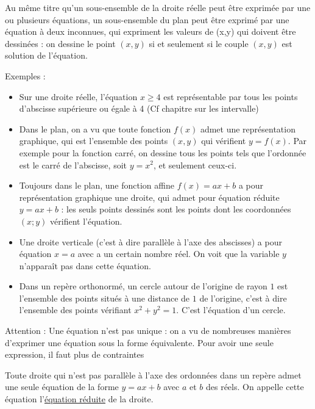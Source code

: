 \documentclass[10pt,a4paper,oneside]{book}
\begin{document}
\begin{de}
    Au même titre qu'un sous-ensemble de la droite réelle peut être exprimée par une ou plusieurs équations, un sous-ensemble du plan peut être exprimé par une équation à deux inconnues, qui expriment les valeurs de (x,y) qui doivent être dessinées : on dessine le point $(x,y)$ si et seulement si le couple $(x,y)$ est solution de l'équation.
\end{de}

Exemples : \begin{itemize}
  \item Sur une droite réelle, l'équation $x \geq 4$ est représentable par tous les points d'abscisse supérieure ou égale à 4 (Cf chapitre sur les intervalle)
  \item Dans le plan, on a vu que toute fonction $f(x)$ admet une représentation graphique, qui est l'ensemble des points $(x,y)$ qui vérifient $y=f(x)$. Par exemple pour la fonction carré, on dessine tous les points tels que l'ordonnée est le carré de l'abscisse, soit $y=x^2$, et seulement ceux-ci.
  \item Toujours dans le plan, une fonction affine $f(x)=ax+b$ a pour représentation graphique une droite, qui admet pour équation réduite $y=ax+b$ : les seuls points dessinés sont les points dont les coordonnées $(x;y)$ vérifient l'équation.
  \item Une droite verticale (c'est à dire parallèle à l'axe des abscisses) a pour équation $x=a$ avec a un certain nombre réel. On voit que la variable $y$ n'apparaît pas dans cette équation.
  \item Dans un repère orthonormé, un cercle autour de l'origine de rayon $1$ est l'ensemble des points situés à une distance de $1$ de l'origine, c'est à dire l'ensemble des points vérifiant $x^2+y^2=1$. C'est l'équation d'un cercle.
\end{itemize}


Attention : Une équation n'est pas unique : on a vu de nombreuses manières d'exprimer une équation sous la forme équivalente.  Pour avoir une seule expression, il faut plus de contraintes


\begin{de}
  Toute droite qui n'est pas parallèle à l'axe des ordonnées dans un repère admet une seule équation de la forme $y=ax+b$ avec $a$ et $b$ des réels. On appelle cette équation l'\underline{équation réduite} de la droite.
\end{de}
\end{document}
